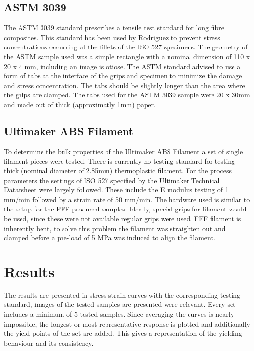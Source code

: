 \subsection{ASTM 3039}
The ASTM 3039 standard \cite{Afd2016NEN-EN-ISO527-2} prescribes a tensile test standard for long fibre composites. This standard has been used by Rodriguez \cite{Rodriguez2001MechanicalInvestigation} to prevent  stress concentrations occurring at the fillets of the ISO 527 specimens. The geometry of the ASTM sample used was a simple rectangle with a nominal dimension of 110 x 20 x 4 mm, including an image is otiose. The ASTM standard advised to use a form of tabs at the interface of the grips and specimen to minimize the damage and stress concentration. The tabs should be slightly longer than the area where the grips are clamped. The tabs used for the ASTM 3039 sample were 20 x 30mm and made out of thick (approximatly 1mm) paper.

\subsection{Ultimaker ABS Filament}
To determine the bulk properties of the Ultimaker ABS Filament a set of single filament pieces were tested. There is currently no testing standard for testing thick (nominal diameter of 2.85mm) thermoplastic filament. For the process parameters the settings of ISO 527 specified by the Ultimaker Technical Datatsheet \cite{TechnicalUM} were largely followed. These include the E modulus testing of 1 mm/min followed by a strain rate of 50 mm/min. The hardware used is similar to the setup for the FFF produced samples. Ideally, special grips for filament would be used, since these were not available regular grips were used. 
FFF filament is inherently bent, to solve this problem the filament was straighten out and clamped before a pre-load of 5 MPa was induced to align the filament. 

\section{Results}
The results are presented in stress strain curves with the corresponding testing standard, images of the tested samples are presented were relevant. Every set includes a minimum of 5 tested samples. Since averaging the curves is nearly impossible, the longest or most representative response is plotted and additionally the yield points of the set are added. This gives a representation of the yielding behaviour and its consistency. 

